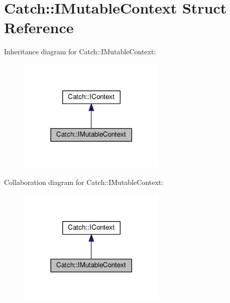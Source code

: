 \hypertarget{structCatch_1_1IMutableContext}{}\section{Catch\+:\+:I\+Mutable\+Context Struct Reference}
\label{structCatch_1_1IMutableContext}


Inheritance diagram for Catch\+:\+:I\+Mutable\+Context\+:
\nopagebreak
\begin{figure}[H]
\begin{center}
\leavevmode
\includegraphics[width=201pt]{structCatch_1_1IMutableContext__inherit__graph}
\end{center}
\end{figure}


Collaboration diagram for Catch\+:\+:I\+Mutable\+Context\+:
\nopagebreak
\begin{figure}[H]
\begin{center}
\leavevmode
\includegraphics[width=201pt]{structCatch_1_1IMutableContext__coll__graph}
\end{center}
\end{figure}
